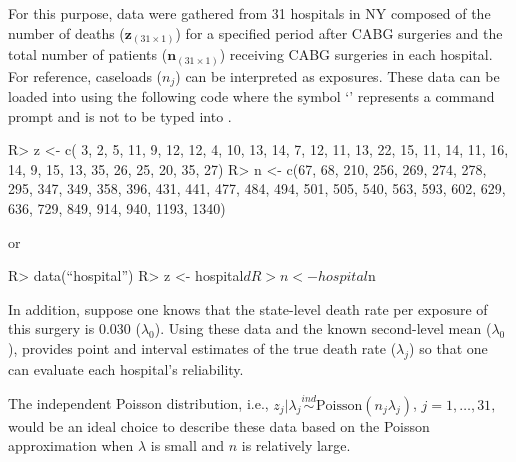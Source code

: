 \documentclass[article]{jss}
\begin{document}
For this purpose, data were gathered from 31 hospitals in NY composed of the number of deaths ($\textbf{z}_{(31\times1)}$) for a specified period after CABG surgeries and the total number of patients ($\textbf{n}_{(31\times1)}$) receiving CABG surgeries in each hospital. For reference, caseloads ($n_{j}$) can be interpreted as exposures. These data can be loaded into  using the following code where the symbol `' represents a command prompt and is not to be typed into .

\begin{CodeChunk}
\begin{CodeInput}
R> z <- c( 3,   2,   5,  11,   9,  12,  12,   4,  10,  13,  14,   7,  12,
          11,  13,  22,  15,  11,  14,  11,  16,  14,   9,  15,  13,  35,
          26,  25,  20,  35,  27)
R> n <- c(67,  68, 210, 256, 269, 274, 278, 295, 347, 349, 358, 396, 431,
         441, 477, 484, 494, 501, 505, 540, 563, 593, 602, 629, 636, 729,
         849, 914, 940, 1193, 1340)
\end{CodeInput}
\end{CodeChunk}
or
\begin{CodeChunk}
\begin{CodeInput}
R> data(``hospital'')
R> z <- hospital$d
R> n <- hospital$n
\end{CodeInput}
\end{CodeChunk}


In addition, suppose one knows that the state-level death rate per exposure of this surgery is 0.030 ($\lambda_{0}$). Using these data and the known second-level mean ($\lambda_{0}$),  provides point and interval estimates of the true death rate ($\lambda_{j}$) so that one can evaluate each hospital's reliability. 


The independent Poisson distribution, i.e.,  $z_{j}\vert \lambda_{j}\stackrel{ind}{\sim} \textrm{Poisson}(n_{j}\lambda_{j})$, $j=1, \ldots, 31,$ would be an ideal choice to describe these data based on the Poisson approximation when $\lambda$ is small and $n$ is relatively large. 
\end{document}
